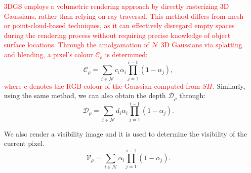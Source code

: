 \documentclass[lettersize,journal]{IEEEtran}
\begin{document}
\textcolor{red}{3DGS employs a volumetric rendering approach by directly rasterizing 3D Gaussians, rather than relying on ray traversal. This method differs from mesh- or point-cloud-based techniques, as it can effectively disregard empty spaces during the rendering process without requiring precise knowledge of object surface locations. Through the amalgamation of $\mathcal{N}$ 3D Gaussians via splatting and blending, a pixel's colour $\mathcal{C}_{\rho}$ is determined:}
\begin{equation}
\mathcal{C}_\rho=\sum_{i\in{\mathcal{N}}}{c}_{i}{\alpha}_{i}\prod_{j=1}^{i-1}(1-{\alpha}_{j}),
\label{eq:Crho}
\end{equation}
\textcolor{red}{where c denotes the RGB colour of the Gaussian computed from $SH$.}
Similarly, using the same method, we can also obtain the depth $\mathcal{D}_{\rho}$ through:
\begin{equation}
\mathcal{D}_\rho=\sum_{i\in{\mathcal{N}}}{d}_{i}{\alpha}_{i}\prod_{j=1}^{i-1}(1-{\alpha}_{j}).
\label{eq:Drho}
\end{equation}

We also render a visibility image and it is used to determine the visibility of the current pixel.
\begin{equation}
\mathcal{V}_{\rho}=\sum_{i\in{\mathcal{N}}}{\alpha}_{i}\prod_{j=1}^{i-1}(1-{\alpha}_{j}).
\label{eq:Vrho}
\end{equation}
\end{document}
